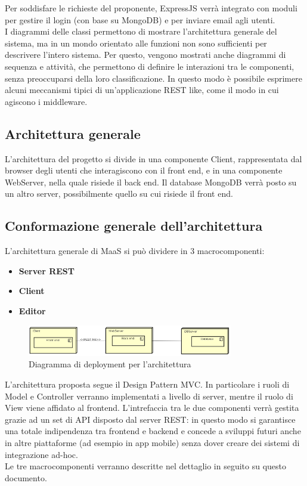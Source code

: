 Per soddisfare le richieste del proponente, ExpressJS verrà integrato con moduli per gestire il login (con base su MongoDB) e per inviare email agli utenti. \\
I diagrammi delle classi permettono di mostrare l'architettura generale del sistema, ma in un mondo orientato alle funzioni non sono sufficienti per descrivere l'intero sistema. Per questo, vengono mostrati anche diagrammi di sequenza e attività, che permettono di definire le interazioni tra le componenti, senza preoccuparsi della loro classificazione. In questo modo è possibile esprimere alcuni meccanismi tipici di un'applicazione REST like, come il modo in cui agiscono i middleware. 
\subsection{Architettura generale}
L'architettura del progetto si divide in una componente Client, rappresentata dal browser degli utenti che interagiscono con il front end, e in una componente WebServer, nella quale risiede il back end. Il database MongoDB verrà posto su un altro server, possibilmente quello su cui risiede il front end. \\
\subsection{Conformazione generale dell'architettura}
L'architettura generale di MaaS si può dividere in 3 macrocomponenti:
\begin{itemize}
\item \textbf{Server REST} 
\item \textbf{Client} 
\item \textbf{Editor}
\end{itemize}
\begin{figure}[h]
\centering
\includegraphics[width=0.8\textwidth]{res/sections/GeneralArchitecture.png}
\caption{Diagramma di deployment per l'architettura}
\end{figure}
L'architettura proposta segue il Design Pattern MVC. In particolare i ruoli di Model e Controller verranno implementati a livello di server, mentre il ruolo di View viene affidato al frontend. L'intrefaccia tra le due componenti verrà gestita grazie ad un set di API disposto dal server REST: in questo modo si garantisce una totale indipendenza tra frontend e backend e concede a sviluppi futuri anche in altre piattaforme (ad esempio in app mobile) senza dover creare dei sistemi di integrazione ad-hoc. \\
Le tre macrocomponenti verranno descritte nel dettaglio in seguito su questo documento.

